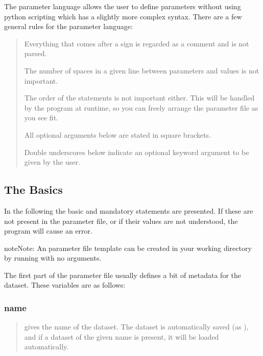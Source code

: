 \documentclass[letterpaper,10pt,english]{sphinxmanual}
\begin{document}
The parameter language allows the user to define parameters without using python scripting
which has a slightly more complex syntax. There are a few general rules for the parameter language:
\begin{quote}

Everything that comes after a \sphinxtitleref{\#} sign is regarded as a comment and is not parsed.

The number of spaces in a given line between parameters and values is not important.

The order of the statements is not important either. This will be handled by the program
at runtime, so you can freely arrange the parameter file as you see fit.

All optional arguments below are stated in square brackets.

Double underscores below indicate an optional keyword argument to be given by the user.
\end{quote}


\subsection{The Basics}
\label{\detokenize{documentation:the-basics}}
In the following the basic and mandatory statements are presented.
If these are not present in the parameter file, or if their values are
not understood, the program will cause an error.

\begin{sphinxadmonition}{note}{Note:}
An parameter file template can be created in your working directory by running  with no arguments.
\end{sphinxadmonition}

The first part of the parameter file usually defines a bit of metadata for the dataset.
These variables are as follows:


\subsubsection{name}
\label{\detokenize{documentation:name}}
\begin{quote}

 gives the name of the dataset.
The dataset is automatically saved (as ),
and if a dataset of the given name is present, it will be loaded automatically.
\end{quote}
\end{document}
